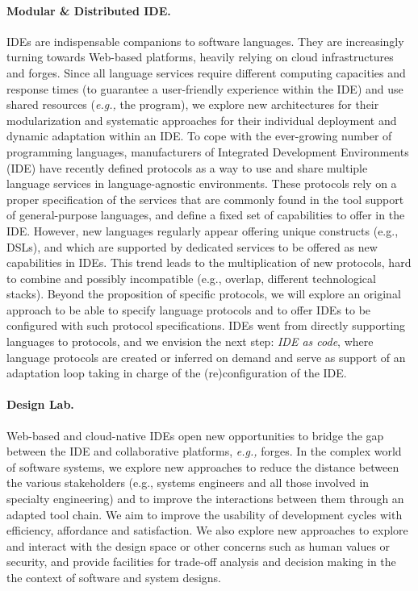 \paragraph{Modular \& Distributed IDE.} IDEs are indispensable companions to software languages. They are increasingly turning towards Web-based platforms, heavily relying on cloud infrastructures and forges. Since all language services require different computing capacities and response times (to guarantee a user-friendly experience within the IDE) and use shared resources (\emph{e.g.,} the program), we explore new architectures for their modularization and systematic approaches for their individual deployment and dynamic adaptation within an IDE. To cope with the ever-growing number of programming languages, manufacturers of Integrated Development Environments (IDE) have recently defined protocols as a way to use and share multiple language services in language-agnostic environments. These protocols rely on a proper specification of the services that are commonly found in the tool support of general-purpose languages, and define a fixed set of capabilities to offer in the IDE. However, new languages regularly appear offering unique constructs (e.g., DSLs), and which are supported by dedicated services to be offered as new capabilities in IDEs. This trend leads to the multiplication of new protocols, hard to combine and possibly incompatible (e.g., overlap, different technological stacks). Beyond the proposition of specific protocols, we will explore an original approach to  be able to specify language protocols and to offer IDEs to be configured with such protocol specifications. IDEs went from directly supporting languages to protocols, and we envision the next step: \emph{IDE as code}, where language protocols are created or inferred on demand and serve as support of an adaptation loop taking in charge of the (re)configuration of the IDE. 

\paragraph{Design Lab.} Web-based and cloud-native IDEs open new opportunities to bridge the gap between the IDE and collaborative platforms, \emph{e.g.,} forges. In the complex world of software systems, we explore new approaches to reduce the distance between the various stakeholders (e.g., systems engineers and all those involved in specialty engineering) and to improve the interactions between them through an adapted tool chain. We aim to improve the usability of development cycles with efficiency, affordance and satisfaction. We also explore new approaches to explore and interact with the design space or other concerns such as human values or security, and provide facilities for trade-off analysis and decision making in the the context of software and system designs. 

